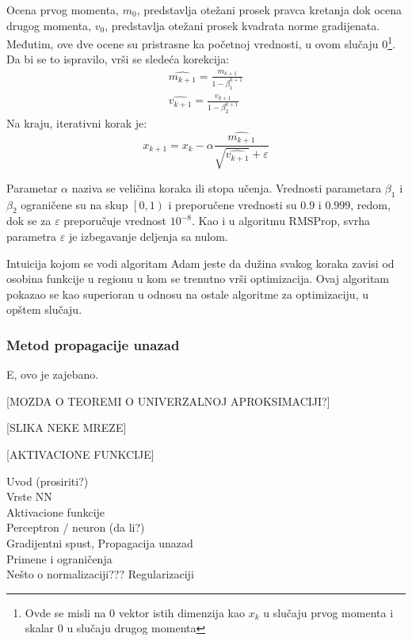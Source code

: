 Ocena prvog momenta, $m_0$, predstavlja otežani prosek pravca kretanja dok ocena drugog momenta, $v_0$, predstavlja otežani prosek kvadrata norme gradijenata. Međutim, ove dve ocene su pristrasne ka početnoj vrednosti, u ovom slučaju $0$\footnote{Ovde se misli na $0$ vektor istih dimenzija kao $x_k$ u slučaju prvog momenta i skalar $0$ u slučaju drugog momenta}. Da bi se to ispravilo, vrši se sledeća korekcija:
\begin{equation}
	\begin{gathered}
		\hat{m_{k+1}} = \frac{m_{k+1} }{1 - \beta_1^{k+1}} \\
		\hat{v_{k+1}} = \frac{v_{k+1} }{1 - \beta_2^{k+1}}
	\end{gathered}
\end{equation}
Na kraju, iterativni korak je:
\begin{equation}
	x_{k+1} = x_k - \alpha \frac{\hat{m_{k+1}}}{\sqrt{\hat{v_{k+1}}} + \varepsilon}
\end{equation}

Parametar $\alpha$ naziva se veličina koraka ili stopa učenja. Vrednosti parametara $\beta_1$ i $\beta_2$ ograničene su na skup $\left[0, 1\right) $ i preporučene vrednosti su $0.9$ i $0.999$, redom, dok se za $\varepsilon$ preporučuje vrednost $10^{-8}$. Kao i u algoritmu RMSProp, svrha parametra $\varepsilon$ je izbegavanje deljenja sa nulom.
\par
Intuicija kojom se vodi algoritam Adam jeste da dužina svakog koraka zavisi od osobina funkcije u regionu u kom se trenutno vrši optimizacija. Ovaj algoritam pokazao se kao superioran u odnosu na ostale algoritme za optimizaciju, u opštem slučaju.



\subsubsection{Metod propagacije unazad}

E, ovo je zajebano.




[MOZDA O TEOREMI O UNIVERZALNOJ APROKSIMACIJI?]

[SLIKA NEKE MREZE]



[AKTIVACIONE FUNKCIJE]

Uvod  (prosiriti?) \\
Vrste NN \\
Aktivacione funkcije \\
Perceptron / neuron (da li?) \\
Gradijentni spust, Propagacija unazad \\
Primene i ograničenja \\
Nešto o normalizaciji??? Regularizaciji